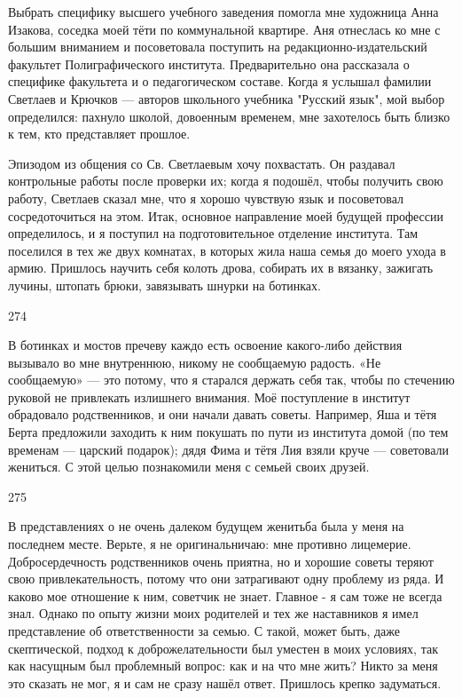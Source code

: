 Выбрать специфику высшего учебного заведения помогла мне художница Анна Изакова, соседка моей тёти по коммунальной квартире. Аня отнеслась ко мне с большим вниманием и посоветовала поступить на редакционно-издательский факультет Полиграфического института. Предварительно она рассказала о специфике факультета и о педагогическом составе. Когда я услышал фамилии Светлаев и Крючков — авторов школьного учебника "Русский язык", мой выбор определился: пахнуло школой, довоенным временем, мне захотелось быть близко к тем, кто представляет прошлое.

Эпизодом из общения со Св. Светлаевым хочу похвастать. Он раздавал контрольные работы после проверки их; когда я подошёл, чтобы получить свою работу, Светлаев сказал мне, что я хорошо чувствую язык и посоветовал сосредоточиться на этом. Итак, основное направление моей будущей профессии определилось, и я поступил на подготовительное отделение института. Там поселился в тех же двух комнатах, в которых жила наша семья до моего ухода в армию. Пришлось научить себя колоть дрова, собирать их в вязанку, зажигать лучины, штопать брюки, завязывать шнурки на ботинках.

274

В ботинках и мостов пречеву каждо есть освоение какого-либо действия вызывало во мне внутреннюю, никому не сообщаемую радость. «Не сообщаемую» — это потому, что я старался держать себя так, чтобы по стечению руковой не привлекать излишнего внимания. Моё поступление в институт обрадовало родственников, и они начали давать советы. Например, Яша и тётя Берта предложили заходить к ним покушать по пути из института домой (по тем временам — царский подарок); дядя Фима и тётя Лия взяли круче — советовали жениться. С этой целью познакомили меня с семьей своих друзей.

275

В представлениях о не очень далеком будущем женитьба была у меня на последнем месте. Верьте, я не оригинальничаю: мне противно лицемерие. Добросердечность родственников очень приятна, но и хорошие советы теряют свою привлекательность, потому что они затрагивают одну проблему из ряда. И каково мое отношение к ним, советчик не знает. Главное - я сам тоже не всегда знал. Однако по опыту жизни моих родителей и тех же наставников я имел представление об ответственности за семью. С такой, может быть, даже скептической, подход к доброжелательности был уместен в моих условиях, так как насущным был проблемный вопрос: как и на что мне жить? Никто за меня это сказать не мог, я и сам не сразу нашёл ответ. Пришлось крепко задуматься.

